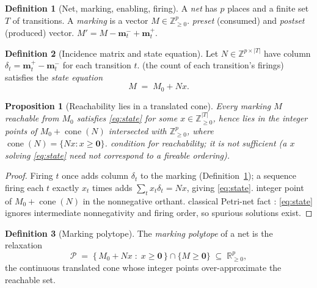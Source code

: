 \documentclass[11pt,oneside]{book}
\theoremstyle{definition}
\newtheorem{definition}{Definition}[chapter]
\theoremstyle{plain}
\newtheorem{proposition}[theorem]{Proposition}
\theoremstyle{remark}
\DeclareMathOperator{\cone}{cone}
\newcommand{\Poly}{\mathcal{P}}                %
\newcommand{\Nmat}{N}                 %
\newcommand{\preset}{\mathbf{m}^{-}}
\newcommand{\postset}{\mathbf{m}^{+}}
\newcommand{\Zplus}{\mathbb{Z}_{\ge 0}}
\newcommand{\Rplus}{\mathbb{R}_{\ge 0}}
\begin{document}
\begin{definition}[Net, marking, enabling, firing]\label{def:net}
A \emph{net} has $p$ places and a finite set $T$ of transitions. A \emph{marking} is a vector
$M\in\Zplus^{p}$.%
\emph{preset} (consumed) and \emph{postset} (produced) vector.%
$M'=M-\preset_{t}+\postset_{t}$.%
\end{definition}

\begin{definition}[Incidence matrix and state equation]\label{def:incidence}
Let $\Nmat\in\mathbb{Z}^{p\times|T|}$ have column $\delta_t=\postset_{t}-\preset_{t}$ for
each transition $t$.%
(the count of each transition's firings) satisfies the \emph{state equation}
\begin{equation}\label{eq:state}
M \;=\; M_0 + \Nmat x .%
\end{equation}
\end{definition}

\begin{proposition}[Reachability lies in a translated cone]\label{prop:cone}
Every marking $M$ reachable from $M_0$ satisfies \eqref{eq:state} for some
$x\in\Zplus^{|T|}$, hence lies in the integer points of
$M_0+\cone(\Nmat)$ intersected with $\Zplus^{p}$, where
$\cone(\Nmat)=\{\Nmat x:x\ge\bm 0\}$.%
condition for reachability; it is not sufficient (a $x$ solving \eqref{eq:state} need not
correspond to a fireable ordering).%
\end{proposition}

\begin{proof}
Firing $t$ once adds column $\delta_t$ to the marking (Definition~\ref{def:net}); a sequence
firing each $t$ exactly $x_t$ times adds $\sum_t x_t\delta_t=\Nmat x$, giving
\eqref{eq:state}.%
integer point of $M_0+\cone(\Nmat)$ in the nonnegative orthant.%
classical Petri-net fact \cite{murata1989}: \eqref{eq:state} ignores intermediate
nonnegativity and firing order, so spurious solutions exist. \end{proof}

\begin{definition}[Marking polytope]\label{def:polytope}
The \emph{marking polytope} of a net is the relaxation
\[
\Poly \;=\; \bigl\{\,M_0+\Nmat x \;:\; x\ge\bm 0\,\bigr\}\cap\{M\ge\bm 0\}
\;\subseteq\;\Rplus^{p},
\]
the continuous translated cone whose integer points over-approximate the reachable set.%
\end{definition}
\end{document}
